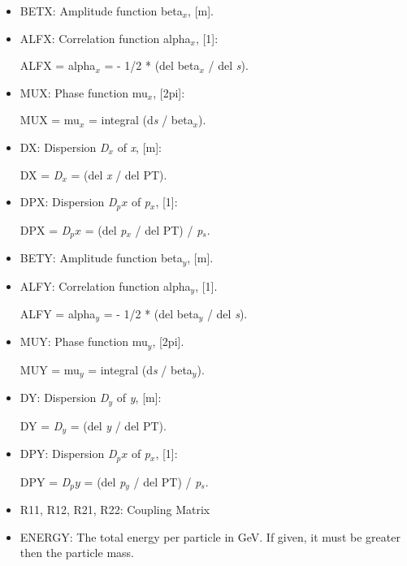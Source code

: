 \begin{itemize}
	\item BETX: Amplitude function beta$_\textit{x}$, [m].   
	\item ALFX: Correlation function alpha$_\textit{x}$, [1]:     

ALFX = alpha$_\textit{x}$ = - 1/2 * (del beta$_\textit{x}$ / del \textit{s}).     


	\item MUX: Phase function mu$_\textit{x}$, [2pi]:     

MUX = mu$_\textit{x}$ = integral (d\textit{s} / beta$_\textit{x}$).     


	\item DX: Dispersion \textit{D$_x$} of \textit{x}, [m]:     

DX = \textit{D$_x$} = (del \textit{x} / del PT).     


	\item DPX: Dispersion \textit{D$_px$} of \textit{p$_x$}, [1]:     

DPX = \textit{D$_px$} = (del \textit{p$_x$} / del PT) / \textit{p$_s$}.     


	\item BETY: Amplitude function beta$_\textit{y}$, [m].   
	\item ALFY: Correlation function alpha$_\textit{y}$, [1].     

ALFY = alpha$_\textit{y}$ = - 1/2 * (del beta$_\textit{y}$ / del \textit{s}).     


	\item MUY: Phase function mu$_\textit{y}$, [2pi].     

MUY = mu$_\textit{y}$ = integral (d\textit{s} / beta$_\textit{y}$).     


	\item DY: Dispersion \textit{D$_y$} of \textit{y}, [m]:     

DY = \textit{D$_y$} = (del \textit{y} / del PT).     


	\item DPY: Dispersion \textit{D$_px$} of \textit{p$_x$}, [1]:     

DPY = \textit{D$_py$} = (del \textit{p$_y$} / del PT) / \textit{p$_s$}.     


	\item R11, R12, R21, R22: Coupling Matrix     


	\item ENERGY: The total energy per particle in GeV. If given, it must be greater then the particle mass.     


\end{itemize}


